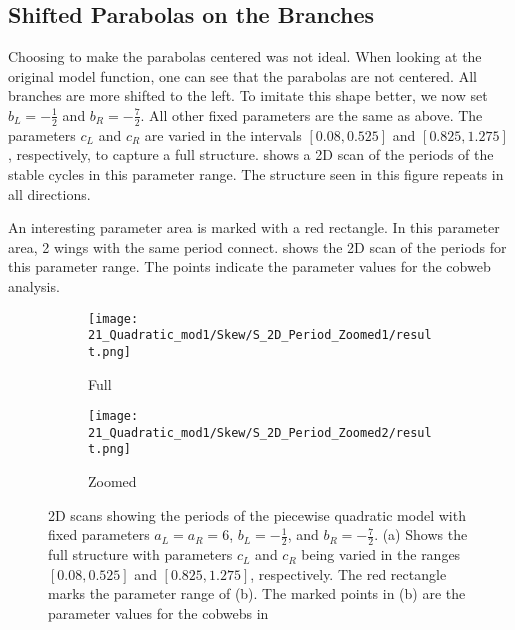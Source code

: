 \subsection{Shifted Parabolas on the Branches}

Choosing to make the parabolas centered was not ideal.
When looking at the original model function, one can see that the parabolas are not centered.
All branches are more shifted to the left.
To imitate this shape better, we now set $b_L = -\frac{1}{2}$ and $b_R = -\frac{7}{2}$.
All other fixed parameters are the same as above.
The parameters $c_L$ and $c_R$ are varied in the intervals $[0.08, 0.525]$ and $[0.825, 1.275]$, respectively, to capture a full structure.
 shows a 2D scan of the periods of the stable cycles in this parameter range.
The structure seen in this figure repeats in all directions.

An interesting parameter area is marked with a red rectangle.
In this parameter area, 2 wings with the same period connect.
 shows the 2D scan of the periods for this parameter range.
The points indicate the parameter values for the cobweb analysis.

\begin{figure}
	\centering
	\begin{subfigure}{0.4\textwidth}
		\centering
		\texttt{[image: 21\_Quadratic\_mod1/Skew/S\_2D\_Period\_Zoomed1/result.png]}
		\caption{Full}
		\label{fig:setup.quad.skew.period.full}
	\end{subfigure}
	\begin{subfigure}{0.4\textwidth}
		\texttt{[image: 21\_Quadratic\_mod1/Skew/S\_2D\_Period\_Zoomed2/result.png]}
		\caption{Zoomed}
		\label{fig:setup.quad.skew.period.zoomed}
	\end{subfigure}
	\caption[2D scans showing periods of the skewed piecewise quadratic model]{
		2D scans showing the periods of the piecewise quadratic model with fixed parameters $a_L = a_R = 6$, $b_L = -\frac{1}{2}$, and $b_R = -\frac{7}{2}$.
		(a) Shows the full structure with parameters $c_L$ and $c_R$ being varied in the ranges $[0.08, 0.525]$ and $[0.825, 1.275]$, respectively.
		The red rectangle marks the parameter range of (b).
		The marked points in (b) are the parameter values for the cobwebs in 
	}
	\label{fig:setup.quad.skew.period}
\end{figure}


